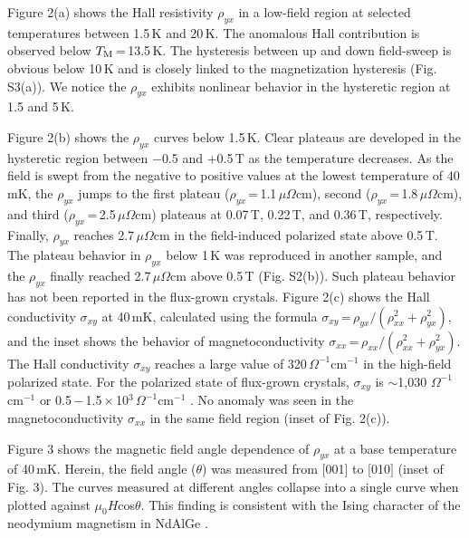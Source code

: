 \documentclass[%
preprint,
 amsmath,amssymb,
 aps,
]{revtex4-2}
\begin{document}
%
Figure 2(a) shows the Hall resistivity $\rho_{yx}$ in a low-field region at selected temperatures 
between 1.5\,K and 20\,K. 
%
The anomalous Hall contribution is observed below $T_{\rm M}$\,=\,13.5\,K. 
%
The hysteresis between up and down field-sweep is obvious below 10\,K and 
is closely linked to the magnetization hysteresis (Fig. S3(a)). 
We notice the $\rho_{yx}$ exhibits nonlinear behavior in the hysteretic region at 1.5 and 5\,K. 
%

%
Figure 2(b) shows the $\rho_{yx}$ curves below 1.5\,K. 
%
Clear plateaus are developed in the hysteretic region between $-$0.5 and $+$0.5\,T 
as the temperature decreases. 
%
As the field is swept from the negative to positive values at the lowest temperature of 40\,mK, 
the $\rho_{yx}$ jumps to the first plateau ($\rho_{yx}$\,=\,1.1\,$\mu\Omega$cm), 
second ($\rho_{yx}$\,=\,1.8\,$\mu\Omega$cm), and third ($\rho_{yx}$\,=\,2.5\,$\mu\Omega$cm) plateaus 
at 0.07\,T, 0.22\,T, and 0.36\,T, respectively. 
%
Finally, $\rho_{yx}$ reaches 2.7\,$\mu\Omega$cm in the field-induced polarized state above 0.5\,T. 
%
The plateau behavior in $\rho_{yx}$ below 1\,K was reproduced in another sample, 
and the $\rho_{yx}$ finally reached 2.7\,$\mu\Omega$cm above 0.5\,T (Fig. S2(b)). 
%
Such plateau behavior has not been reported in the flux-grown crystals. 
%
Figure 2(c) shows 
the Hall conductivity $\sigma_{xy}$ at 40\,mK, 
calculated using the formula $\sigma_{xy}$\,=\,$\rho_{yx}/(\rho_{xx}^2 +\rho_{yx}^2)$, 
and the inset shows the behavior of magnetoconductivity 
$\sigma_{xx}$\,=\,$\rho_{xx}/(\rho_{xx}^2 +\rho_{yx}^2)$. 
%
The Hall conductivity $\sigma_{xy}$ reaches 
a large value of 320\,$\Omega^{-1}$cm$^{-1}$ in the high-field polarized state. 
%
For the polarized state of flux-grown crystals, $\sigma_{xy}$ is 
$\sim$1,030 $\Omega^{-1}$cm$^{-1}$ \cite{Dhital_PhyrevB_2023} or 
0.5\,$-$\,1.5\,$\times$\,10$^{3}$\,$\Omega^{-1}$cm$^{-1}$ \cite{Yang_PhysRevMater_2023}. 
%
No anomaly was seen in the magnetoconductivity $\sigma_{xx}$ in the same field region 
(inset of Fig. 2(c)). 
%

%
Figure 3 shows the magnetic field angle dependence of $\rho_{yx}$ at a base temperature of 40\,mK. 
Herein, the field angle ($\theta$) was measured 
from $\lbrack$001$\rbrack$ to $\lbrack$010$\rbrack$ (inset of Fig. 3). 
%
The curves measured at different angles collapse into a single curve when plotted against 
$\mu_{0}$$H$cos$\theta$. 
%
This finding is consistent with the Ising character of the neodymium magnetism in NdAlGe 
\cite{Zhao_NewJPhys_2022,Yang_PhysRevMater_2023,Cho_SSRN_2022,Dhital_PhyrevB_2023,Kikugawa_inorganics_2023}. 
%
\end{document}
